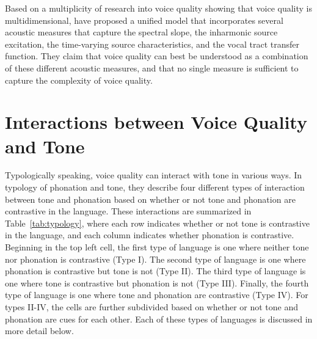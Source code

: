 Based on a multiplicity of research into voice quality showing that voice quality is multidimensional, \citet{kreimanUnifiedTheoryVoice2014,kreimanValidatingPsychoacousticModel2021} have proposed a unified model that incorporates several acoustic measures that capture the spectral slope, the inharmonic source excitation, the time-varying source characteristics, and the vocal tract transfer function. They claim that voice quality can best be understood as a combination of these different acoustic measures, and that no single measure is sufficient to capture the complexity of voice quality.

\section{Interactions between Voice Quality and Tone} \label{sec:interactions_between_voice_quality_and_tone}

Typologically speaking, voice quality can interact with tone in various ways. In  typology of phonation and tone, they describe four different types of interaction between tone and phonation based on whether or not tone and phonation are contrastive in the language. These interactions are summarized in Table~\ref{tab:typology}, where each row indicates whether or not tone is contrastive in the language, and each column indicates whether phonation is contrastive. Beginning in the top left cell, the first type of language is one where neither tone nor phonation is contrastive (Type I). The second type of language is one where phonation is contrastive but tone is not (Type II). The third type of language is one where tone is contrastive but phonation is not (Type III). Finally, the fourth type of language is one where tone and phonation are contrastive (Type IV). For types II-IV, the cells are further subdivided based on whether or not tone and phonation are cues for each other. Each of these types of languages is discussed in more detail below.

